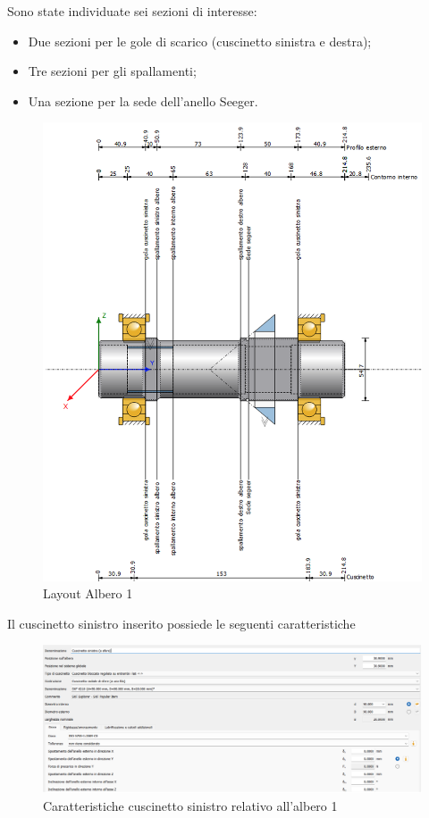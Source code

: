 Sono state individuate sei sezioni di interesse:
\begin{itemize}
    \item Due sezioni per le gole di scarico (cuscinetto sinistra e destra);
    \item Tre sezioni per gli spallamenti;
    \item Una sezione per la sede dell'anello Seeger.
\end{itemize}
\newpage
\begin{figure}[h]
    \centering
    \includegraphics[scale=0.55]{Immagini/Albero1.png}
    \caption{Layout Albero 1}
    \label{fig:Albero1}
\end{figure}
\newpage

Il cuscinetto sinistro inserito possiede le seguenti caratteristiche
\begin{figure}[h]
    \centering
    \includegraphics[scale=0.4]{Immagini/CuscinettoSinistraAlbero1.png}
    \caption{Caratteristiche cuscinetto sinistro relativo all'albero 1}
    \label{fig:CuscinettoSinsitraAlbero1}
\end{figure}

